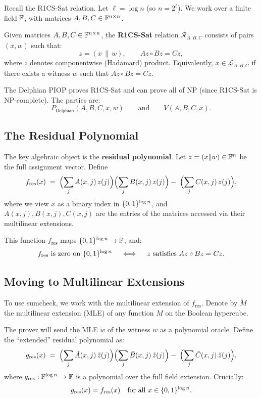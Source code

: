 \documentclass[11pt]{article}
\begin{document}
Recall the R1CS-Sat relation. Let $\ell = \log n$ (so $n = 2^\ell$). We work
over a finite field $\mathbb{F}$, with matrices $A, B, C \in \mathbb{F}^{n \times n}$.

\begin{defbox}
Given matrices $A, B, C \in \mathbb{F}^{n \times n}$, the \textbf{R1CS-Sat} relation
$\mathcal{R}_{A,B,C}$ consists of pairs $(x, w)$ such that:
\[
  z = (x \,\|\, w), \qquad Az \circ Bz = Cz,
\]
where $\circ$ denotes componentwise (Hadamard) product. Equivalently,
$x \in \mathcal{L}_{A,B,C}$ if there exists a witness $w$ such that
$Az \circ Bz = Cz$.
\end{defbox}

The Delphian PIOP proves R1CS-Sat and can prove all of NP (since R1CS-Sat is
NP-complete). The parties are:
\[
  P_{\mathsf{Delphian}}(A, B, C, x, w) \qquad \text{and} \qquad V(A, B, C, x).
\]

\subsection{The Residual Polynomial}

The key algebraic object is the \textbf{residual polynomial}. Let
$z = (x \| w) \in \mathbb{F}^n$ be the full assignment vector. Define
\[
  f_{\mathrm{res}}(x) \;=\;
  \Bigl(\sum_j A(x,j)\, z(j)\Bigr)
  \Bigl(\sum_j B(x,j)\, z(j)\Bigr)
  -\;
  \Bigl(\sum_j C(x,j)\, z(j)\Bigr),
\]
where we view $x$ as a binary index in $\{0,1\}^{\log n}$, and $A(x,j),
B(x,j), C(x,j)$ are the entries of the matrices accessed via their
multilinear extensions.

This function $f_{\mathrm{res}}$ maps $\{0,1\}^{\log n} \to \mathbb{F}$, and:
\[
  f_{\mathrm{res}} \text{ is zero on } \{0,1\}^{\log n}
  \quad\iff\quad
  z \text{ satisfies } Az \circ Bz = Cz.
\]

\subsection{Moving to Multilinear Extensions}

To use sumcheck, we work with the multilinear extension of $f_{\mathrm{res}}$.
Denote by $\tilde{M}$ the multilinear extension (MLE) of any function $M$ on
the Boolean hypercube.

The prover will send the MLE $\tilde{w}$ of the witness $w$ as a polynomial
oracle. Define the ``extended'' residual polynomial as:
\[
  g_{\mathrm{res}}(x) \;=\;
  \Bigl(\sum_j \tilde{A}(x,j)\,\tilde{z}(j)\Bigr)
  \Bigl(\sum_j \tilde{B}(x,j)\,\tilde{z}(j)\Bigr)
  -\;
  \Bigl(\sum_j \tilde{C}(x,j)\,\tilde{z}(j)\Bigr),
\]
where $g_{\mathrm{res}}: \mathbb{F}^{\log n} \to \mathbb{F}$ is a polynomial over the full
field extension. Crucially:
\[
  g_{\mathrm{res}}(x) = f_{\mathrm{res}}(x) \quad \text{for all } x \in \{0,1\}^{\log n}.
\]
\end{document}
